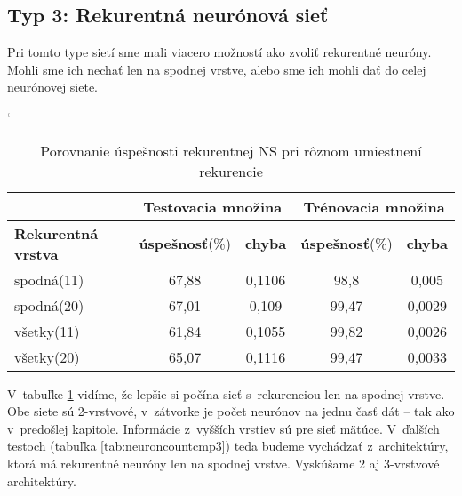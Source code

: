\subsection{Typ 3: Rekurentná neurónová sieť}
Pri tomto type sietí sme mali viacero možností ako zvoliť rekurentné neuróny. Mohli sme ich nechať len na spodnej vrstve, alebo sme ich mohli dať do celej neurónovej siete.

\begin{table}[htp]
\catcode` %
\centering
\begin{tabular}{|l|c|c|c|c|}
\cline{2-5}
\multicolumn{1}{l}{} & \multicolumn{2}{|c|}{\textbf{Testovacia množina}} & \multicolumn{2}{c|}{\textbf{Trénovacia množina}} \\ 
\hline
\textbf{Rekurentná vrstva} & \textbf{úspešnosť}(\%) & \textbf{chyba} & \textbf{úspešnosť}(\%) & \textbf{chyba}  \\ \hline
spodná(11) &  67,88 & 0,1106 & 98,8 & 0,005  \\ \hline
spodná(20) & 67,01 & 0,109 & 99,47 & 0,0029  \\ \hline
všetky(11) & 61,84 & 0,1055 & 99,82 & 0,0026  \\ \hline
všetky(20) & 65,07 & 0,1116 & 99,47 & 0,0033  \\ \hline
\end{tabular}
\caption{Porovnanie úspešnosti rekurentnej NS pri rôznom umiestnení rekurencie}
\label{tab:reclayercmp}
\end{table}

V~tabuľke \ref{tab:reclayercmp} vidíme, že lepšie si počína sieť s~rekurenciou len na spodnej vrstve. Obe siete sú 2-vrstvové, v~zátvorke je počet neurónov na jednu časť dát -- tak ako v~predošlej kapitole. Informácie z~vyšších vrstiev sú pre sieť mätúce. V~ďalších testoch (tabuľka \ref{tab:neuroncountcmp3}) teda budeme vychádzať z~architektúry, ktorá má rekurentné neuróny len na spodnej vrstve. Vyskúšame 2 aj 3-vrstvové architektúry.


